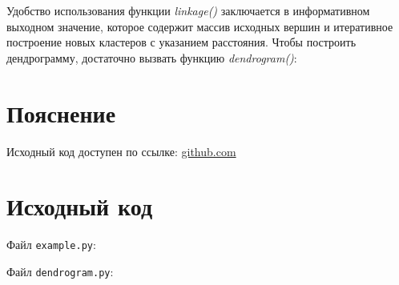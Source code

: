 \documentclass{article} %
\begin{document}
\clearpage

Удобство использования функции \textit{linkage()} заключается в информативном выходном значение,
которое содержит массив исходных вершин и итеративное построение новых кластеров с указанием расстояния.
Чтобы построить дендрограмму, достаточно вызвать функцию \textit{dendrogram()}:

\noindent{}

\section{Пояснение}
Исходный код доступен по ссылке:
\href{https://github.com/SvichkarevAnatoly/Course-Python-Bioinformatics/tree/master/semester2/task1}
{github.com}

\clearpage

\section{Исходный код}
Файл \verb$example.py$:


Файл \verb$dendrogram.py$:

\end{document}
